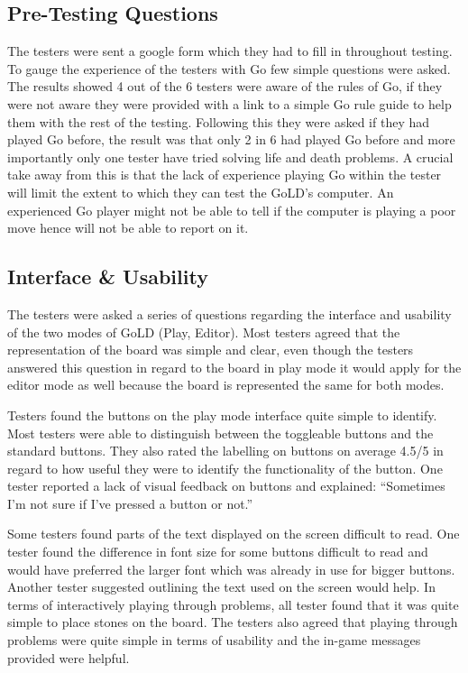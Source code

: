 \documentclass{l4proj}
\begin{document}
\subsection{Pre-Testing Questions}
The testers were sent a google form which they had to fill in throughout testing. To gauge the experience of the testers with Go few simple questions were asked. The results showed 4 out of the 6 testers were aware of the rules of Go, if they were not aware they were provided with a link to a simple Go rule guide to help them with the rest of the testing. Following this they were asked if they had played Go before, the result was that only 2 in 6 had played Go before and more importantly only one tester have tried solving life and death problems. A crucial take away from this is that the lack of experience playing Go within the tester will limit the extent to which they can test the GoLD’s computer. An experienced Go player might not be able to tell if the computer is playing a poor move hence will not be able to report on it.

\subsection{Interface \& Usability}
The testers were asked a series of questions regarding the interface and usability of the two modes of GoLD (Play, Editor). Most testers agreed that the representation of the board was simple and clear, even though the testers answered this question in regard to the board in play mode it would apply for the editor mode as well because the board is represented the same for both modes.

Testers found the buttons on the play mode interface quite simple to identify. Most testers were able to distinguish between the toggleable buttons and the standard buttons. They also rated the labelling on buttons on average 4.5/5 in regard to how useful they were to identify the functionality of the button. One tester reported a lack of visual feedback on buttons and explained: “Sometimes I'm not sure if I've pressed a button or not.”

Some testers found parts of the text displayed on the screen difficult to read. One tester found the difference in font size for some buttons difficult to read and would have preferred the larger font which was already in use for bigger buttons. Another tester suggested outlining the text used on the screen would help. In terms of interactively playing through problems, all tester found that it was quite simple to place stones on the board. The testers also agreed that playing through problems were quite simple in terms of usability and the in-game messages provided were helpful.
\end{document}
